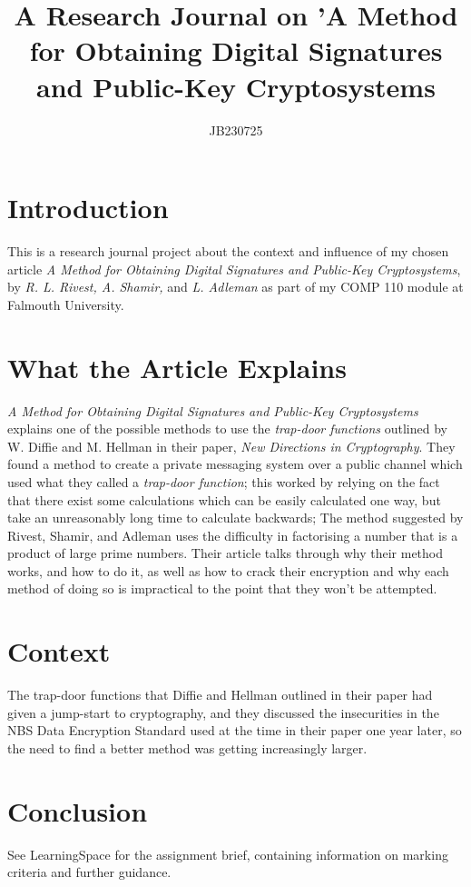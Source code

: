 \documentclass{article}
\title{A Research Journal on 'A Method for Obtaining Digital Signatures and Public-Key Cryptosystems}
\author{JB230725}
\begin{document}
\maketitle

\section{Introduction}

This is a research journal project about the context and influence of my chosen article \textit{A Method for Obtaining Digital Signatures and Public-Key Cryptosystems}, by \textit{R. L. Rivest, A. Shamir,} and \textit{L. Adleman} \cite{rivest1978_rsa} as part of my COMP 110 module at Falmouth University.

\section{What the Article Explains}

\textit{A Method for Obtaining Digital Signatures and Public-Key Cryptosystems} explains one of the possible methods to use the \textit{trap-door functions} outlined by W. Diffie and M. Hellman in their paper, \textit{New Directions in Cryptography}\cite{diffie1976new}. They found a method to create a private messaging system over a public channel which used what they called a \textit{trap-door function}; this worked by relying on the fact that there exist some calculations which can be easily calculated one way, but take an unreasonably long time to calculate backwards; The method suggested by Rivest, Shamir, and Adleman uses the difficulty in factorising a number that is a product of large prime numbers. \newline
Their article talks through why their method works, and how to do it, as well as how to crack their encryption and why each method of doing so is impractical to the point that they won't be attempted.

\section{Context}

The trap-door functions that Diffie and Hellman outlined in their paper\cite{diffie1976new} had given a jump-start to cryptography, and they discussed the insecurities in the NBS Data Encryption Standard used at the time in their paper one year later\cite{diffie1977special}, so the need to find a better method was getting increasingly larger. 

\section{Conclusion}

See LearningSpace for the assignment brief, containing information on marking criteria and further guidance.



\end{document}
